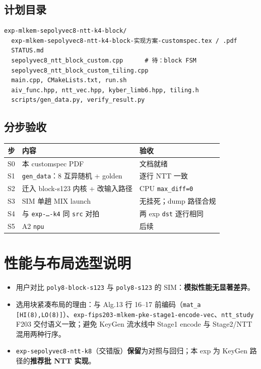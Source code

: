 \documentclass[UTF8,a4paper,11pt]{ctexart}
\begin{document}
\subsection{计划目录}
\begin{verbatim}
exp-mlkem-sepolyvec8-ntt-k4-block/
  exp-mlkem-sepolyvec8-ntt-k4-block-实现方案-customspec.tex / .pdf
  STATUS.md
  sepolyvec8_ntt_block_custom.cpp      # 待：block FSM
  sepolyvec8_ntt_block_custom_tiling.cpp
  main.cpp, CMakeLists.txt, run.sh
  aiv_func.hpp, ntt_vec.hpp, kyber_limb6.hpp, tiling.h
  scripts/gen_data.py, verify_result.py
\end{verbatim}

\subsection{分步验收}
\begin{table}[h]
  \centering
  \begin{tabular}{@{}cll@{}}
    \toprule
    步 & 内容 & 验收 \\
    \midrule
    S0 & 本 customspec PDF & 文档就绪 \\
    S1 & \texttt{gen\_data}：8 互异随机 + golden & 逐行 NTT 一致 \\
    S2 & 迁入 block-s123 内核 + 改输入路径 & CPU \texttt{max\_diff=0} \\
    S3 & SIM 单趟 MIX launch & 无挂死；dump 路径合规 \\
    S4 & 与 \texttt{exp-…-k4} 同 \texttt{src} 对拍 & 两 exp \texttt{dst} 逐行相同 \\
    S5 & A2 \texttt{npu} & 后续 \\
    \bottomrule
  \end{tabular}
\end{table}

\section{性能与布局选型说明}

\begin{itemize}
  \item 用户对比 \texttt{poly8-block-s123} 与 \texttt{poly8-s123} 的 SIM：\textbf{模拟性能无显著差异}。
  \item 选用块紧凑布局的理由：与 Alg.13 行 16–17 前编码（\texttt{mat\_a [HI(8),LO(8)]}）、\texttt{exp-fips203-mlkem-pke-stage1-encode-vec}、\texttt{ntt\_study} F203 交付语义一致；避免 KeyGen 流水线中 Stage1 encode 与 Stage2/NTT 混用两种行序。
  \item \texttt{exp-sepolyvec8-ntt-k8}（交错版）\textbf{保留}为对照与回归；本 exp 为 KeyGen 路径的\textbf{推荐批 NTT 实现}。
\end{itemize}
\end{document}

